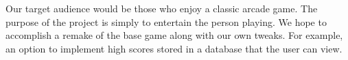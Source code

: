 \documentclass[10pt,conference,onecolumn,compsoc]{IEEEtran}
\begin{document}
Our target audience would be those who enjoy a classic arcade game. The purpose of the project is simply to entertain the person playing. We hope to accomplish a remake of the base game along with our own tweaks. For example, an option to implement high scores stored in a database that the user can view. 





%
%



%
%
\end{document}
